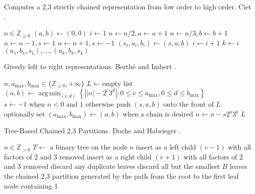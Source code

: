 \documentclass{ucalgthes1}
\theoremstyle{plain}
\theoremstyle{definition}
\DeclareMathOperator*{\argmin}{arg\,min}
\newcommand{\ZZgtz}{\mathbb{Z}_{>0}}
\newcommand{\ZZgez}{\mathbb{Z}_{\ge 0}}
\newcommand{\amax}{a_\textrm{max}}
\newcommand{\bmax}{b_\textrm{max}}
\begin{document}
\begin{algorithm}[h]
\caption{Computes a 2,3 strictly chained representation from low order to high order. Ciet \cite{Ciet2006}.}
\label{alg:rtolDbnsChain}
\begin{algorithmic}[1]
\REQUIRE $n \in \ZZgez$
\STATE $(a, b) \gets (0, 0)$
\STATE $i \gets 1$
		\STATE $n \gets n / 2, a \gets a + 1$
	\ENDWHILE
		\STATE $n \gets n / 3, b \gets b + 1$
	\ENDWHILE
		\STATE $n \gets n - 1, s \gets 1$
		\STATE $n \gets n + 1, s \gets -1$
	\ENDIF
	\STATE $(s_i, a_i, b_i) \gets (s, a, b)$
	\STATE $i \gets i + 1$
\ENDWHILE
\STATE $k \gets i$
\RETURN $(a_1, b_1, s_1), ..., (a_k, b_k, s_k)$
\end{algorithmic}
\end{algorithm}

\begin{algorithm}[h]
\caption{Greedy left to right representations. Berth\'{e} and Imbert \cite{Berthe2009}.}
\label{alg:greedyltor}
\begin{algorithmic}[1]
\REQUIRE $n, \amax, \bmax \in \{\ZZgez, +\infty\}$ 
\STATE $L \gets \textrm{empty list}$
	\STATE $(a, b) \gets \argmin_{(c, d)} \left\{\left||n| - 2^c3^d \right| : 0 \le c \le \amax, 0 \le d \le \bmax \right\}$
	\STATE $s \gets -1 \textrm{ when } n < 0 \textrm{ and } 1 \textrm{ otherwise}$
	\STATE $\textrm{push }(s, a, b) \textrm{ onto the front of } L$
	\STATE $\textrm{optionally set } (\amax, \bmax) \gets (a, b) \textrm{ when a chain is desired}$
	\STATE $n \gets n - s2^a3^b$
\ENDWHILE
\RETURN $L$
\end{algorithmic}
\end{algorithm}

\begin{algorithm}[h]
\caption{Tree-Based Chained 2,3 Partitions. Doche and Habsieger \cite{Doche2008}.}
\label{alg:dbnsTree}
\begin{algorithmic}[1]
\REQUIRE $n \in \ZZgtz$
\STATE $T \gets$ a binary tree on the node $n$
		\STATE insert as a left child $(v - 1)$ with all factors of 2 and 3 removed
		\STATE insert as a right child $(v + 1)$ with all factors of 2 and 3 removed
	\ENDFOR
	\STATE discard any duplicate leaves
	\STATE discard all but the smallest $B$ leaves
\ENDWHILE
\RETURN the chained 2,3 partition generated by the path from the root to the first leaf node containing 1
\end{algorithmic}
\end{algorithm}
\end{document}
